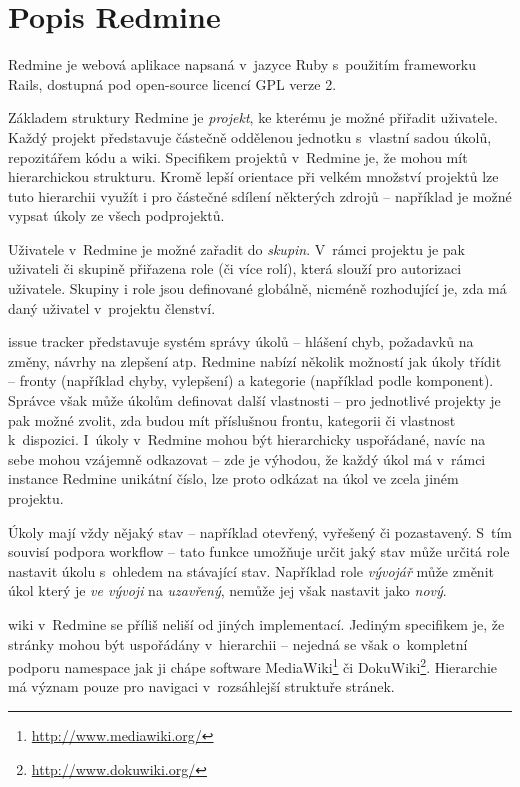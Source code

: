 \documentclass[thesis=B,czech]{FITthesis}[2012/05/02]
\begin{document}
\section{Popis Redmine}

Redmine je webová aplikace napsaná v~jazyce Ruby s~použitím frameworku
Rails, dostupná pod open-source licencí \gls{GPL} verze 2.

Základem struktury Redmine je \emph{projekt}, ke kterému je možné
přiřadit uživatele. Každý projekt představuje částečně oddělenou
jednotku s~vlastní sadou úkolů, repozitářem kódu a \gls{wiki}.
Specifikem projektů v~Redmine je, že mohou mít hierarchickou strukturu.
Kromě lepší orientace při velkém množství projektů lze tuto hierarchii
využít i pro částečné sdílení některých zdrojů -- například je možné
vypsat úkoly ze všech podprojektů.

Uživatele v~Redmine je možné zařadit do \emph{skupin}. V~rámci projektu
je pak uživateli či skupině přiřazena role (či více rolí), která slouží
pro autorizaci uživatele. Skupiny i role jsou definované globálně,
nicméně rozhodující je, zda má daný uživatel v~projektu členství.

\Gls{issue tracker} představuje systém správy úkolů -- hlášení chyb,
požadavků na změny, návrhy na zlepšení atp. Redmine nabízí několik
možností jak úkoly třídit -- fronty (například chyby, vylepšení) a
kategorie (například podle komponent). Správce však může úkolům
definovat další vlastnosti -- pro jednotlivé projekty je pak možné
zvolit, zda budou mít příslušnou frontu, kategorii či vlastnost
k~dispozici. I~úkoly v~Redmine mohou být hierarchicky uspořádané, navíc na
sebe mohou vzájemně odkazovat -- zde je výhodou, že každý úkol má
v~rámci instance Redmine unikátní číslo, lze proto odkázat na úkol ve
zcela jiném projektu.

Úkoly mají vždy nějaký stav -- například otevřený, vyřešený či
pozastavený. S~tím souvisí podpora \gls{workflow} -- tato funkce
umožňuje určit jaký stav může určitá role nastavit úkolu s~ohledem na
stávající stav. Například role \emph{vývojář} může změnit úkol který je
\emph{ve vývoji} na \emph{uzavřený}, nemůže jej však nastavit jako
\emph{nový}.

\Gls{wiki} v~Redmine se příliš neliší od jiných implementací. Jediným
specifikem je, že stránky mohou být uspořádány v~hierarchii -- nejedná
se však o~kompletní podporu \gls{namespace} jak ji chápe software
MediaWiki\footnote{\url{http://www.mediawiki.org/}} či
DokuWiki\footnote{\url{http://www.dokuwiki.org/}}. Hierarchie má význam
pouze pro navigaci v~rozsáhlejší struktuře stránek.
\end{document}
